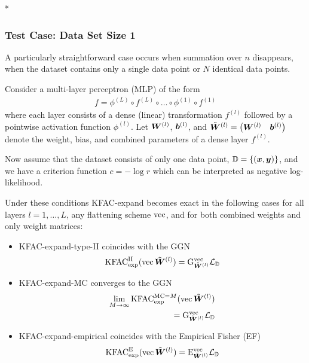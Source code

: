 \switchcolumn[1]*
\switchcolumn[0]

\subsubsection{Test Case: Data Set Size 1}
A particularly straightforward case occurs when summation over $n$ disappears, \ie when the dataset contains only a single data point or $N$ identical data points. 

\begin{test}\label{test:kfac_expand_linear_no_weight_sharing_batch_size_1}
  Consider a multi-layer perceptron (MLP) of the form
  \begin{align*}
    f = \phi^{(L)} \circ f^{(L)} \circ \ldots \circ \phi^{(1)} \circ f^{(1)}
  \end{align*}
  where each layer consists of a dense (linear) transformation $f^{(l)}$ followed by a pointwise activation function $\phi^{(l)}$.
  Let $\mW^{(l)}$, $\vb^{(l)}$, and $\tilde{\mW}^{(l)} = \begin{pmatrix} \mW^{(l)} & \vb^{(l)} \end{pmatrix}$ denote the weight, bias, and combined parameters of a dense layer $f^{(l)}$.

  Now assume that the dataset consists of only one data point, $\sD = \{ (\vx, \vy) \}$, and we have a criterion function $c = - \log r$ which can be interpreted as negative log-likelihood.
  
  Under these conditions KFAC-expand becomes exact in the following cases for all layers $l = 1, \dots, L$, any flattening scheme $\vec$, and for both combined weights and only weight matrices:
  \begin{itemize}
  \item KFAC-expand-type-II coincides with the GGN
    \begin{align*}
      \kfac^{\text{II}}_{\text{exp}}(\vec\tilde{\mW}^{(l)}) = \ggn^{\vec}_{\tilde{\mW}^{(l)}}\gL_{\sD}
    \end{align*}
  \item KFAC-expand-MC converges to the GGN
    \begin{align*}
      \lim_{M \to \infty} \kfac^{\text{MC}=M}_{\text{exp}}(\vec\tilde{\mW}^{(l)})
      \\
      = \ggn^{\vec}_{\tilde{\mW}^{(l)}}\gL_{\sD}
    \end{align*}
  \item KFAC-expand-empirical coincides with the Empirical Fisher (EF)
    \begin{align*}
      \kfac^{\text{E}}_{\text{exp}}(\vec\tilde{\mW}^{(l)}) = \ef^{\vec}_{\tilde{\mW}^{(l)}}\gL_{\sD}
    \end{align*}
  \end{itemize}
\end{test}

